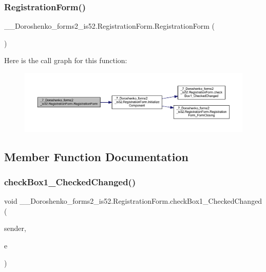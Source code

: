 \subsubsection{\texorpdfstring{Registration\+Form()}{RegistrationForm()}}
{\footnotesize\ttfamily \+\_\+\_\+\+Doroshenko\+\_\+forms2\+\_\+is52.\+Registration\+Form.\+Registration\+Form (\begin{DoxyParamCaption}{ }\end{DoxyParamCaption})}

Here is the call graph for this function\+:
\nopagebreak
\begin{figure}[H]
\begin{center}
\leavevmode
\includegraphics[width=350pt]{class__7___doroshenko__forms2__is52_1_1_registration_form_aba6aa95f4dc1f3d80399b15c141be71f_cgraph}
\end{center}
\end{figure}


\subsection{Member Function Documentation}
\hypertarget{class__7___doroshenko__forms2__is52_1_1_registration_form_ab5089f0bb46579d23942b19d4bbcd542}{}\label{class__7___doroshenko__forms2__is52_1_1_registration_form_ab5089f0bb46579d23942b19d4bbcd542} 
\subsubsection{\texorpdfstring{check\+Box1\+\_\+\+Checked\+Changed()}{checkBox1\_CheckedChanged()}}
{\footnotesize\ttfamily void \+\_\+\_\+\+Doroshenko\+\_\+forms2\+\_\+is52.\+Registration\+Form.\+check\+Box1\+\_\+\+Checked\+Changed (\begin{DoxyParamCaption}\item[{object}]{sender,  }\item[{Event\+Args}]{e }\end{DoxyParamCaption})\hspace{0.3cm}{\ttfamily [private]}}

